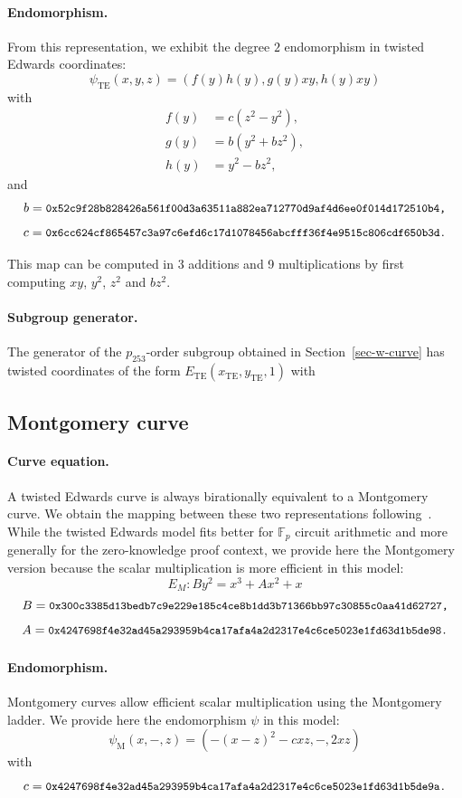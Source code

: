 \documentclass[smallextended]{svjour3}
\begin{document}
\paragraph{Endomorphism.}
From this representation, we exhibit the degree $2$ endomorphism in
twisted Edwards coordinates:
$$
\psi_\text{TE}(x,y,z) = \left(f(y)h(y), g(y)xy, h(y)xy\right)$$
with
\begin{align*}
  f(y) &= c(z^2-y^2),\\
  g(y) &= b(y^2+bz^2),\\
  h(y) &= y^2-bz^2,
\end{align*}
and
$$b = \text{{\small {\tt 0x52c9f28b828426a561f00d3a63511a882ea712770d9af4d6ee0f014d172510b4,}}}$$
$$c = \text{{\small {\tt 0x6cc624cf865457c3a97c6efd6c17d1078456abcfff36f4e9515c806cdf650b3d.}}}$$

This map can be computed in 3 additions and 9 multiplications by
first computing $xy$, $y^2$, $z^2$ and $bz^2$.

\paragraph{Subgroup generator.}
The generator of the $p_{253}$-order subgroup obtained in
Section~\ref{sec-w-curve} has twisted coordinates
of the form $E_\text{TE}(x_\text{TE},y_\text{TE},1)$ with


\subsection{Montgomery curve}
\paragraph{Curve equation.}
A twisted Edwards curve is always birationally equivalent to a
Montgomery curve. We obtain the mapping between these two
representations following~\cite{JCEng:CosSmi18}.
While the twisted Edwards model fits better for $\mathbb F_p$ circuit
arithmetic and more generally for the zero-knowledge proof context, we
provide here the Montgomery version because the scalar multiplication
is more efficient in this model:
$$E_M: By^2 = x^3 + Ax^2 + x$$
$$B = \text{{\small {\tt 0x300c3385d13bedb7c9e229e185c4ce8b1dd3b71366bb97c30855c0aa41d62727,}}}$$
$$A = \text{{\small {\tt 0x4247698f4e32ad45a293959b4ca17afa4a2d2317e4c6ce5023e1fd63d1b5de98.}}}$$

\paragraph{Endomorphism.}
Montgomery curves allow efficient scalar multiplication using the
Montgomery ladder. We provide here the endomorphism $\psi$ in this
model:
$$\psi_\text{M}(x,-,z) = (-(x-z)^2 - cxz, -, 2xz)$$
with
$$c = \text{{\small {\tt 0x4247698f4e32ad45a293959b4ca17afa4a2d2317e4c6ce5023e1fd63d1b5de9a.}}}$$
\end{document}
